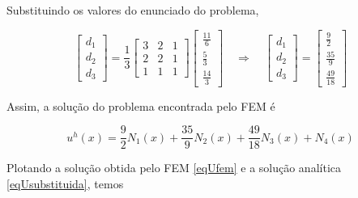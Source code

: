 \documentclass[12pt]{scrartcl}
\newcommand{\logo}{\quad \Rightarrow \quad}
\begin{document}
\endgroup

Substituindo os valores do enunciado do problema, 

\begingroup
\renewcommand*{\arraystretch}{2}

\[
    \begin{bmatrix}
        d_1    \\
        d_2    \\
        d_3
    \end{bmatrix} =
    \frac{1}{3}
    \begin{bmatrix}
        3  & 2 & 1  \\
        2 & 2  & 1 \\
        1  & 1 & 1
    \end{bmatrix}
    \begin{bmatrix}
        \frac{11}{6} \\
        \frac{5}{3} \\
        \frac{14}{3} 
    \end{bmatrix}
    \logo
    \begin{bmatrix}
        d_1    \\
        d_2    \\
        d_3
    \end{bmatrix} =
    \begin{bmatrix}
        \frac{9}{2} \\
        \frac{35}{9} \\
        \frac{49}{18} 
    \end{bmatrix}
\]

\endgroup

Assim, a solução do problema encontrada pelo FEM é   

\begin{equation}\label{eqUfem}
    \boxed{u^h(x) = \frac{9}{2}N_1(x) + \frac{35}{9}N_2(x) + \frac{49}{18}N_3(x) + N_{4}(x)}
\end{equation}


Plotando a solução obtida pelo FEM \eqref{eqUfem} e a solução analítica \eqref{eqUsubstituida}, temos
\end{document}
